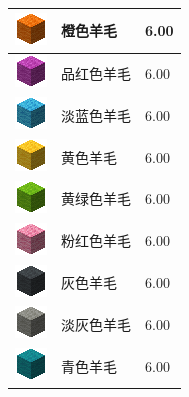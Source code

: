 \documentclass[UTF8]{ctexart}
\begin{document}
\begin{longtable}[]{|p{1cm}|p{8cm}|p{1.5cm}|}
	\hline
	\includegraphics{.workspace/icons/minecraft/minecraft__wool__1.png} & 橙色羊毛 &6.00\\
	\hline
	\includegraphics{.workspace/icons/minecraft/minecraft__wool__2.png} & 品红色羊毛 &6.00\\
	\hline
	\includegraphics{.workspace/icons/minecraft/minecraft__wool__3.png} & 淡蓝色羊毛 &6.00\\
	\hline
	\includegraphics{.workspace/icons/minecraft/minecraft__wool__4.png} & 黄色羊毛 &6.00\\
	\hline
	\includegraphics{.workspace/icons/minecraft/minecraft__wool__5.png} & 黄绿色羊毛 &6.00\\
	\hline
	\includegraphics{.workspace/icons/minecraft/minecraft__wool__6.png} & 粉红色羊毛 &6.00\\
	\hline
	\includegraphics{.workspace/icons/minecraft/minecraft__wool__7.png} & 灰色羊毛 &6.00\\
	\hline
	\includegraphics{.workspace/icons/minecraft/minecraft__wool__8.png} & 淡灰色羊毛 &6.00\\
	\hline
	\includegraphics{.workspace/icons/minecraft/minecraft__wool__9.png} & 青色羊毛 &6.00\\

\end{longtable}
\end{document}
